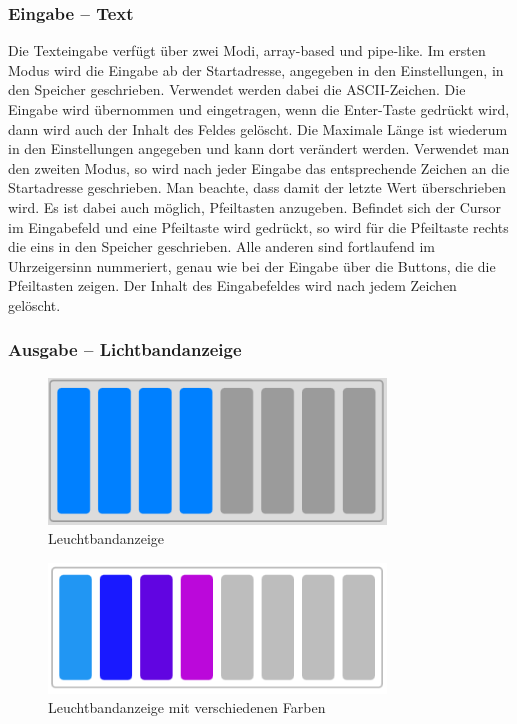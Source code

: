 \subsubsection{Eingabe -- Text}
Die Texteingabe verfügt über zwei Modi, array-based und pipe-like.
Im ersten Modus wird die Eingabe ab der Startadresse, angegeben in den Einstellungen, in den Speicher geschrieben. Verwendet werden dabei die ASCII-Zeichen. Die Eingabe wird übernommen und eingetragen, wenn die Enter-Taste gedrückt wird, dann wird auch der Inhalt des Feldes gelöscht. Die Maximale Länge ist wiederum in den Einstellungen angegeben und kann dort verändert werden. Verwendet man den zweiten Modus, so wird nach jeder Eingabe das entsprechende Zeichen an die Startadresse geschrieben. Man beachte, dass damit der letzte Wert überschrieben wird. Es ist dabei auch möglich, Pfeiltasten anzugeben. Befindet sich der Cursor im Eingabefeld und eine Pfeiltaste wird gedrückt, so wird für die Pfeiltaste rechts die eins in den Speicher geschrieben. Alle anderen sind fortlaufend im Uhrzeigersinn nummeriert, genau wie bei der Eingabe über die Buttons, die die Pfeiltasten zeigen. Der Inhalt des Eingabefeldes wird nach jedem Zeichen gelöscht.

\subsubsection{Ausgabe -- Lichtbandanzeige}



\begin{figure}[ht]
	\centering
  \includegraphics[width=0.8\textwidth]{Images/Lightstrip}
	\caption{Leuchtbandanzeige}
	\label{Lightstrip}
\end{figure}

\begin{figure}[ht]
	\centering
  \includegraphics[width=0.8\textwidth]{Images/Lightstrip_colors}
	\caption{Leuchtbandanzeige mit verschiedenen Farben}
	\label{Lightstrip_Colors}
\end{figure}


